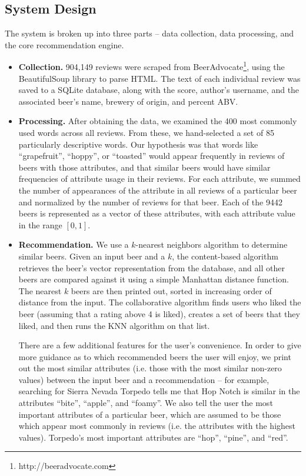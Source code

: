 \documentclass[11pt]{article}
\begin{document}

\subsection*{System Design}
The system is broken up into three parts -- data collection, data processing, and the core recommendation engine.
\begin{itemize}
\item \textbf{Collection.} 904,149 reviews were scraped from BeerAdvocate\footnote{http://beeradvocate.com}, using the BeautifulSoup library to parse HTML. The text of each individual review was saved to a SQLite database, along with the score, author's username, and the associated beer's name, brewery of origin, and percent ABV.
\item \textbf{Processing.} After obtaining the data, we examined the 400 most commonly used words across all reviews. From these, we hand-selected a set of 85 particularly descriptive words. Our hypothesis was that words like ``grapefruit'', ``hoppy'', or ``toasted'' would appear frequently in reviews of beers with those attributes, and that similar beers would have similar frequencies of attribute usage in their reviews. For each attribute, we summed the number of appearances of the attribute in all reviews of a particular beer and normalized by the number of reviews for that beer. Each of the 9442 beers is represented as a vector of these attributes, with each attribute value in the range $[0, 1]$.
\item \textbf{Recommendation.} We use a $k$-nearest neighbors algorithm to determine similar beers. Given an input beer and a $k$, the content-based algorithm retrieves the beer's vector representation from the database, and all other beers are compared against it using a simple Manhattan distance function. The nearest $k$ beers are then printed out, sorted in increasing order of distance from the input. The collaborative algorithm finds users who liked the beer (assuming that a rating above 4 is liked), creates a set of beers that they liked, and then runs the KNN algorithm on that list.
  
  There are a few additional features for the user's convenience. In order to give more guidance as to which recommended beers the user will enjoy, we print out the most similar attributes (i.e. those with the most similar non-zero values) between the input beer and a recommendation -- for example, searching for Sierra Nevada Torpedo tells me that Hop Notch is similar in the attributes ``bite'', ``apple'', and ``foamy''. We also tell the user the most important attributes of a particular beer, which are assumed to be those which appear most commonly in reviews (i.e. the attributes with the highest values). Torpedo's most important attributes are ``hop'', ``pine'', and ``red''.
  

\end{itemize}
\end{document}
